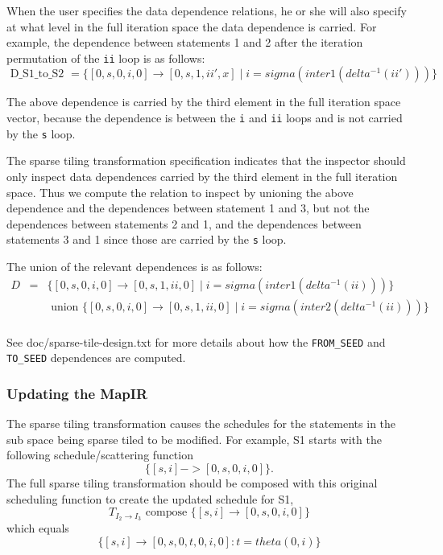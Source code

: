 \documentclass{article}
\begin{document}
When the user specifies the data dependence relations, he or she will also specify at what level
in the full iteration space the data dependence is carried.
For example, the dependence between statements 1 and 2 after the iteration permutation of the {\tt ii} loop is as follows:
\[
	\mbox{ D\_S1\_to\_S2 }  = \{   [ 0, s, 0, i, 0 ] \rightarrow [0, s,1, ii', x ] \; | \; i = sigma(inter1(delta^{-1}(ii'))) \} 
\]

The above dependence is carried by the third element in the full iteration space vector, because the dependence is between the {\tt i} and {\tt ii} loops and is not carried by the {\tt s} loop.

The sparse tiling transformation specification indicates that the inspector should only inspect data dependences carried by the third element in the full iteration space.  Thus we compute the relation to inspect by unioning the above dependence and the dependences between statement 1 and 3, but not the dependences between statements 2 and 1, and the dependences between statements 3 and 1 since those are carried by the {\tt s} loop.

The union of the relevant dependences is as follows:
\[
\begin{array}{rcl}
	D & = & \{ [0, s, 0, i, 0] \rightarrow [0, s, 1, ii, 0] \; | \; i = sigma(inter1(delta^{-1}(ii)))  \} \\
	& & \mbox{ union } \{ [0,s,0,i,0] \rightarrow [0,s,1,ii,0] \; | \; i = sigma(inter2(delta^{-1}(ii)))  \}\\
\end{array}
\]

See doc/sparse-tile-design.txt for more details about how the {\tt FROM\_SEED} and {\tt TO\_SEED} dependences are computed.


\subsubsection{Updating the MapIR}

The sparse tiling transformation causes the 
schedules for the statements in the sub space being sparse tiled to be modified.
For example, S1 starts with the following schedule/scattering function
\[
	\{[s,i]->[0,s,0,i,0] \}.
\]
The full sparse tiling transformation should be composed with this original scheduling function to create the updated schedule for S1, 
\[
	T_{I_2 \rightarrow I_3} \mbox{ compose } \{[s,i] \rightarrow [0,s,0,i,0] \}
\]
which equals
\[
	\{ [s,i] \rightarrow [0,s,0,t,0,i,0] : t=theta(0,i) \}
\]
\end{document}
